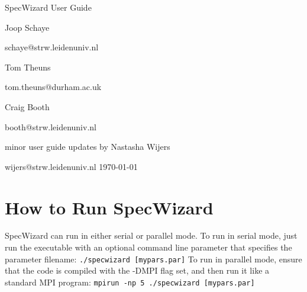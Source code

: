 \documentclass{report}
\begin{document}
\begin{center}
\thispagestyle{empty}
 
 \vspace{20cm}
\begin{Huge}SpecWizard User Guide\end{Huge}
\vspace{5cm}\linebreak

\begin{Large}Joop Schaye\linebreak\end{Large}
{\large schaye@strw.leidenuniv.nl}\vspace{0.5cm}\linebreak
\begin{Large}Tom Theuns\linebreak\end{Large}
{\large tom.theuns@durham.ac.uk}\vspace{0.5cm}\linebreak
\begin{Large}Craig Booth\linebreak\end{Large}
{\large booth@strw.leidenuniv.nl} \vspace{2cm}\linebreak
\begin{large}minor user guide updates by Nastasha Wijers\linebreak\end{large}
{wijers@strw.leidenuniv.nl}
\vspace{6cm}\linebreak
\today
\end{center}
\pagebreak
\tableofcontents

\chapter{How to Run SpecWizard}

SpecWizard can run in either serial or parallel mode.  To run in serial mode, just run the executable with an optional command line parameter that specifies the parameter filename:
\linebreak\linebreak
{\tt ./specwizard [mypars.par]}
\linebreak\linebreak
To run in parallel mode, ensure that the code is compiled with the -DMPI flag set, and then run it like a standard MPI program:
\linebreak\linebreak
{\tt mpirun -np 5 ./specwizard [mypars.par]}
\linebreak\linebreak
\end{document}
